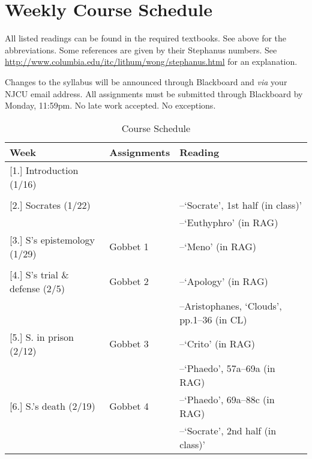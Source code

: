 \documentclass[article,oneside]{memoir}
\begin{document}
\section{Weekly Course Schedule}
All listed readings can be found in the required textbooks. See above for the abbreviations. Some references are given by their Stephanus numbers. See \href{http://www.columbia.edu/itc/lithum/wong/stephanus.html}{http://www.columbia.edu/itc/lithum/wong/stephanus.html} for an explanation. 

 Changes to the syllabus will be announced through Blackboard and \emph{via} your NJCU email address.  All assignments must be submitted through Blackboard by Monday, 11:59pm. No late work accepted. No exceptions.   \newline

\begin{center}
\begin{longtable}{p{4.5cm}p{2cm}p{6cm}}
 
  \caption{Course Schedule} \\
  \toprule
  \textbf{Week} &\textbf{Assignments} & \textbf{Reading} \\
  \midrule

  

[1.] Introduction	(1/16)	  			& 	 			&   \\
								&		  		&    \\ [1.8\baselineskip]

[2.] Socrates (1/22)					& 				& --`Socrate', 1st half (in class)' \\
			        					&			  	& --`Euthyphro'  (in RAG) \\  [1.8\baselineskip]
	
[3.] S's epistemology  (1/29)				& Gobbet 1		&  --`Meno' (in RAG) \\
			       					&		  		&   \\[1.8\baselineskip]


[4.] S's trial \& defense (2/5)				& Gobbet 2		& --`Apology' (in RAG) \\
			     				   	& 			    	& --Aristophanes, `Clouds', pp.1--36 (in CL) \\ [1.8\baselineskip]

[5.] S. in prison (2/12)	& Gobbet 3		 & --`Crito' (in RAG)\\
								& 			    	&  --`Phaedo', 57a--69a (in RAG)\\ [1.8\baselineskip]



[6.] S.'s death (2/19)	   	& Gobbet 4		 & --`Phaedo', 69a--88c  (in RAG)   \\
			        					& 				 & --`Socrate', 2nd half (in class)' \\ [1.8\baselineskip]
  

\end{longtable}
\end{center}
\end{document}

